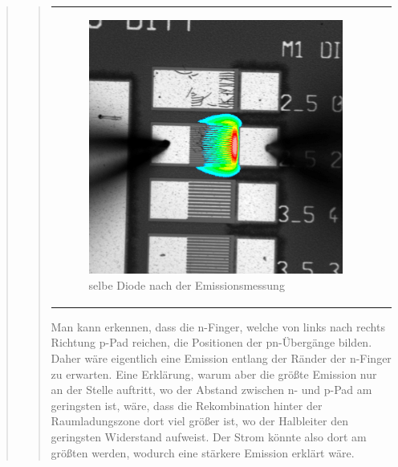 \begin{quote}
\begin{quote}
\begin{center}
\begin{tabular}{ll}
\begin{minipage}{0.6\textwidth}
                    \end{minipage}
                    \begin{minipage}{0.6\textwidth}
    
                         \begin{figure}[H]
                            \label{fig:}
                            \includegraphics[scale=0.25, trim = 0cm 0cm 0cm
                            0cm,
                            clip]{./Emissionsbilder/fuenf/SuperImpose.jpg}
                            \caption{selbe Diode nach der Emissionsmessung}
                        \end{figure}
                   \vspace{-1.5em}
    
                    \end{minipage}
    
                \end{tabular}
                \end{center}
                
        \vspace{2em}
        
        Man kann erkennen, dass die n-Finger, welche von links nach rechts
        Richtung p-Pad reichen, die Positionen der pn-Übergänge bilden. Daher
        wäre eigentlich eine Emission entlang der Ränder der n-Finger zu erwarten.
        Eine Erklärung, warum aber die größte Emission nur an der Stelle
        auftritt, wo der Abstand zwischen n- und p-Pad am geringsten ist, wäre, dass die
        Rekombination hinter der Raumladungszone dort viel größer ist, wo der
        Halbleiter den geringsten Widerstand aufweist. Der Strom könnte also
        dort am größten werden, wodurch eine stärkere Emission erklärt wäre.
        

\end{quote}
\end{quote}
